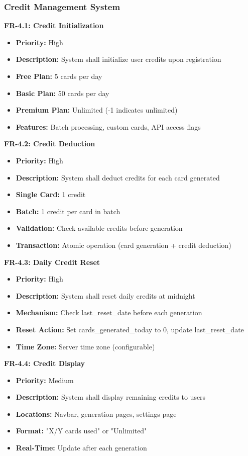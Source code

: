 \documentclass[12pt,a4paper]{article}
\begin{document}
\subsubsection{Credit Management System}

\textbf{FR-4.1: Credit Initialization}
\begin{itemize}
    \item \textbf{Priority:} High
    \item \textbf{Description:} System shall initialize user credits upon registration
    \item \textbf{Free Plan:} 5 cards per day
    \item \textbf{Basic Plan:} 50 cards per day
    \item \textbf{Premium Plan:} Unlimited (-1 indicates unlimited)
    \item \textbf{Features:} Batch processing, custom cards, API access flags
\end{itemize}

\textbf{FR-4.2: Credit Deduction}
\begin{itemize}
    \item \textbf{Priority:} High
    \item \textbf{Description:} System shall deduct credits for each card generated
    \item \textbf{Single Card:} 1 credit
    \item \textbf{Batch:} 1 credit per card in batch
    \item \textbf{Validation:} Check available credits before generation
    \item \textbf{Transaction:} Atomic operation (card generation + credit deduction)
\end{itemize}

\textbf{FR-4.3: Daily Credit Reset}
\begin{itemize}
    \item \textbf{Priority:} High
    \item \textbf{Description:} System shall reset daily credits at midnight
    \item \textbf{Mechanism:} Check last\_reset\_date before each generation
    \item \textbf{Reset Action:} Set cards\_generated\_today to 0, update last\_reset\_date
    \item \textbf{Time Zone:} Server time zone (configurable)
\end{itemize}

\textbf{FR-4.4: Credit Display}
\begin{itemize}
    \item \textbf{Priority:} Medium
    \item \textbf{Description:} System shall display remaining credits to users
    \item \textbf{Locations:} Navbar, generation pages, settings page
    \item \textbf{Format:} "X/Y cards used" or "Unlimited"
    \item \textbf{Real-Time:} Update after each generation
\end{itemize}
\end{document}
